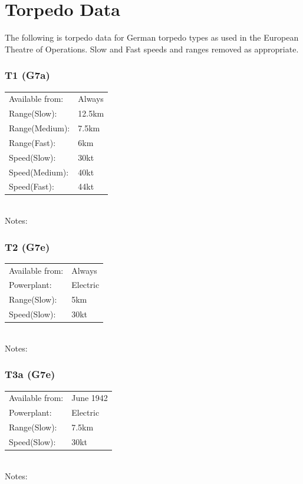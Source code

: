 \documentclass{article}
\begin{document}
\section{Torpedo Data}
The following is torpedo data for German torpedo types as used in the European Theatre of Operations.
Slow and Fast speeds and ranges removed as appropriate.

\subsubsection{T1 (G7a)}
\begin{tabular}{l|l}
Available from:& Always\\
Range(Slow):& 12.5km\\
Range(Medium):& 7.5km\\
Range(Fast):& 6km\\
Speed(Slow):&30kt\\
Speed(Medium):&40kt\\
Speed(Fast):&44kt\\
\end{tabular} \\
Notes:\\

\subsubsection{T2 (G7e)}
\begin{tabular}{l|l}
Available from:& Always\\
Powerplant:&Electric\\
Range(Slow):& 5km\\
Speed(Slow):& 30kt\\
\end{tabular} \\
Notes:\\

\subsubsection{T3a (G7e)}
\begin{tabular}{l|l}
Available from:& June 1942\\
Powerplant:&Electric\\
Range(Slow):& 7.5km\\
Speed(Slow):& 30kt\\
\end{tabular} \\
Notes:\\
\end{document}
